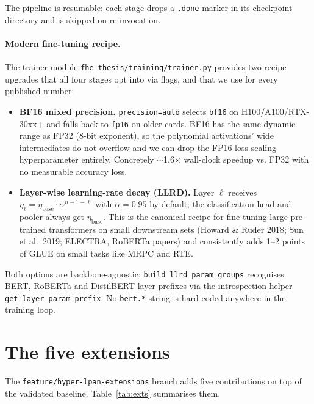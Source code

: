 \documentclass[11pt,a4paper]{article}
\begin{document}
The pipeline is resumable: each stage drops a \texttt{.done} marker
in its checkpoint directory and is skipped on re-invocation.

\paragraph{Modern fine-tuning recipe.}
The trainer module
\texttt{fhe\_thesis/training/trainer.py} provides two recipe
upgrades that all four stages opt into via flags, and that we use
for every published number:
\begin{itemize}
\item \textbf{BF16 mixed precision.} \texttt{precision=\"auto\"}
  selects \texttt{bf16} on H100/A100/RTX-30xx+ and falls back to
  \texttt{fp16} on older cards. BF16 has the same dynamic range as
  FP32 (8-bit exponent), so the polynomial activations' wide
  intermediates do not overflow and we can drop the FP16 loss-scaling
  hyperparameter entirely. Concretely $\sim$1.6$\times$ wall-clock
  speedup vs. FP32 with no measurable accuracy loss.
\item \textbf{Layer-wise learning-rate decay (LLRD).}
  Layer $\ell$ receives
  $\eta_\ell = \eta_{\text{base}} \cdot \alpha^{n-1-\ell}$
  with $\alpha=0.95$ by default; the classification head and pooler
  always get $\eta_{\text{base}}$. This is the canonical recipe for
  fine-tuning large pre-trained transformers on small downstream sets
  (Howard \& Ruder 2018; Sun et al.\ 2019; ELECTRA, RoBERTa papers)
  and consistently adds 1--2 points of GLUE on small tasks like
  MRPC and RTE.
\end{itemize}
Both options are backbone-agnostic: \texttt{build\_llrd\_param\_groups}
recognises BERT, RoBERTa and DistilBERT layer prefixes via the
introspection helper \texttt{get\_layer\_param\_prefix}. No
\texttt{bert.*} string is hard-coded anywhere in the training loop.

\section{The five extensions}

The \texttt{feature/hyper-lpan-extensions} branch adds five
contributions on top of the validated baseline. Table~\ref{tab:exts}
summarises them.
\end{document}
